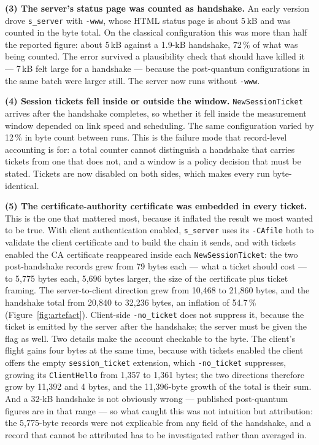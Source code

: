 \documentclass[]{spie}  %
\begin{document}
\textbf{(3) The server's status page was counted as handshake.} An early
version drove \texttt{s\_server} with \texttt{-www}, whose HTML status
page is about 5\,kB and was counted in the byte total. On the classical
configuration this was more than half the reported figure: about 5\,kB
against a 1.9-kB handshake, 72\,\% of what was being counted. The error
survived a plausibility check that should have killed it --- 7\,kB felt
large for a handshake --- because the post-quantum configurations in the
same batch were larger still. The server now runs without
\texttt{-www}.

\textbf{(4) Session tickets fell inside or outside the window.}
\texttt{NewSessionTicket} arrives after the handshake completes, so
whether it fell inside the measurement window depended on link speed and
scheduling. The same configuration varied by 12\,\% in byte count
between runs. This is the failure mode that record-level accounting is
for: a total counter cannot distinguish a handshake that carries tickets
from one that does not, and a window is a policy decision that must be
stated. Tickets are now disabled on both sides, which makes every run
byte-identical.

\textbf{(5) The certificate-authority certificate was embedded in every
ticket.} This is the one that mattered most, because it inflated the
result we most wanted to be true. With client authentication enabled,
\texttt{s\_server} uses its \texttt{-CAfile} both to validate the client
certificate and to build the chain it sends, and with tickets enabled the
CA certificate reappeared inside each \texttt{NewSessionTicket}: the two
post-handshake records grew from 79 bytes each --- what a ticket should
cost --- to 5{,}775 bytes each, 5{,}696 bytes larger, the size of the
certificate plus ticket framing. The server-to-client direction grew
from 10{,}468 to 21{,}860 bytes, and the handshake total from 20{,}840
to 32{,}236 bytes, an inflation of 54.7\,\% (Figure~\ref{fig:artefact}).
Client-side \texttt{-no\_ticket} does not suppress it, because the
ticket is emitted by the server after the handshake; the server must be
given the flag as well. Two details make the account checkable to the
byte. The client's flight gains four bytes at the same time, because
with tickets enabled the client offers the empty \texttt{session\_ticket}
extension, which \texttt{-no\_ticket} suppresses, growing its
\texttt{ClientHello} from 1{,}357 to 1{,}361 bytes; the two directions
therefore grow by 11{,}392 and 4 bytes, and the 11{,}396-byte growth of
the total is their sum. And a 32-kB handshake is not obviously wrong
--- published post-quantum figures are in that range --- so what caught
this was not intuition but attribution: the 5{,}775-byte records were not
explicable from any field of the handshake, and a record that cannot be
attributed has to be investigated rather than averaged in.
\end{document}

